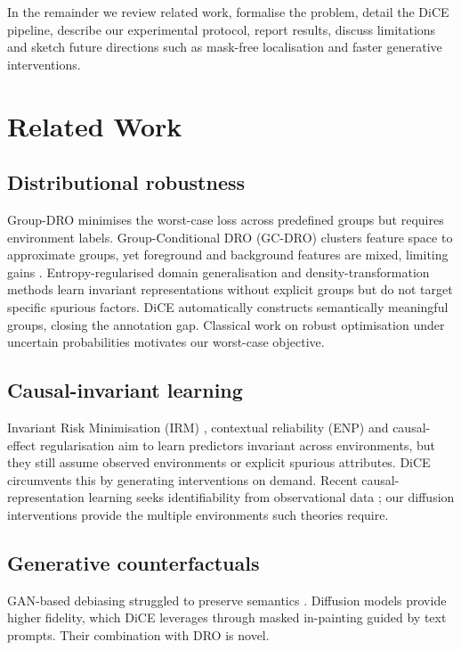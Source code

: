 \documentclass{article}
\begin{document}
In the remainder we review related work, formalise the problem, detail the DiCE pipeline, describe our experimental protocol, report results, discuss limitations and sketch future directions such as mask-free localisation and faster generative interventions.

\section{Related Work}
\subsection{Distributional robustness}
Group-DRO minimises the worst-case loss across predefined groups but requires environment labels. Group-Conditional DRO (GC-DRO) clusters feature space to approximate groups, yet foreground and background features are mixed, limiting gains \cite{zhou-2021-examining}. Entropy-regularised domain generalisation \cite{author-year-domain} and density-transformation methods \cite{nguyen-2021-domain} learn invariant representations without explicit groups but do not target specific spurious factors. DiCE automatically constructs semantically meaningful groups, closing the annotation gap. Classical work on robust optimisation under uncertain probabilities \cite{author-year-robust} motivates our worst-case objective.

\subsection{Causal-invariant learning}
Invariant Risk Minimisation (IRM) \cite{arjovsky-2019-invariant}, contextual reliability (ENP) \cite{ghosal-2023-contextual} and causal-effect regularisation \cite{kumar-2023-causal} aim to learn predictors invariant across environments, but they still assume observed environments or explicit spurious attributes. DiCE circumvents this by generating interventions on demand. Recent causal-representation learning seeks identifiability from observational data \cite{morioka-2023-causal,xu-2024-sparsity}; our diffusion interventions provide the multiple environments such theories require.

\subsection{Generative counterfactuals}
GAN-based debiasing struggled to preserve semantics \cite{bahng-2019-learning}. Diffusion models provide higher fidelity, which DiCE leverages through masked in-painting guided by text prompts. Their combination with DRO is novel.
\end{document}
